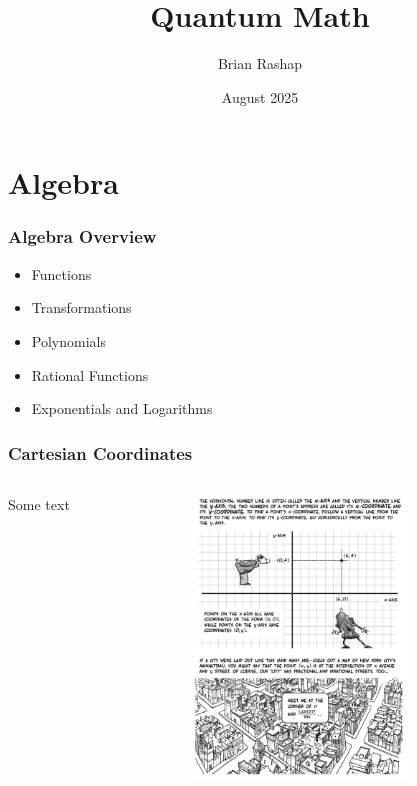 \documentclass{beamer}
\begin{document}
\title{Quantum Math}
\author{Brian Rashap}
\date{August 2025} 



\begin{frame}
\titlepage
\end{frame}

\section{Algebra}
\begin{frame}\frametitle{Algebra Overview}
\begin{itemize}
\item Functions
\item Transformations
\item Polynomials
\item Rational Functions
\item Exponentials and Logarithms
\end{itemize}
\end{frame}

\begin{frame}\frametitle{Cartesian Coordinates}
\begin{columns}
\begin{column}{4cm}
Some text
\end{column}
\begin{column}{6cm}
\begin{center}
\includegraphics[height=7.5cm]{fig/plotting.jpg}
\end{center}
\end{column}
\end{columns}
\end{frame}
\end{document}

